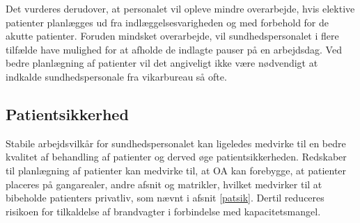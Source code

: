 Det vurderes derudover, at personalet vil opleve mindre overarbejde, hvis elektive patienter planlægges ud fra indlæggelsesvarigheden og med forbehold for de akutte patienter. Foruden mindsket overarbejde, vil sundhedspersonalet i flere tilfælde have mulighed for at afholde de indlagte pauser på en arbejdsdag. Ved bedre planlægning af patienter vil det angiveligt ikke være nødvendigt at indkalde sundhedspersonale fra vikarbureau så ofte. 


\subsection{Patientsikkerhed}
Stabile arbejdsvilkår for sundhedspersonalet kan ligeledes medvirke til en bedre kvalitet af behandling af patienter og derved øge patientsikkerheden. Redskaber til planlægning af patienter kan medvirke til, at OA kan forebygge, at patienter placeres på gangarealer, andre afsnit og matrikler, hvilket medvirker til at bibeholde patienters privatliv, som nævnt i afsnit \ref{patsik}. Dertil reduceres risikoen for tilkaldelse af brandvagter i forbindelse med kapacitetsmangel. 

